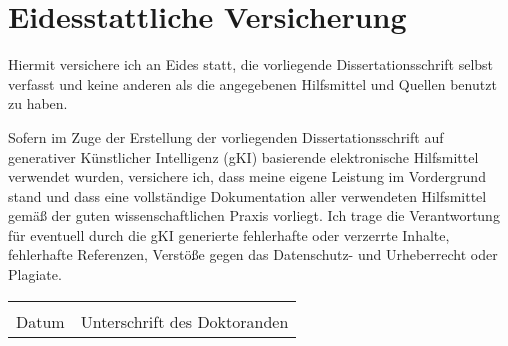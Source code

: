 \cleardoublepage
\chapter*{Eidesstattliche Versicherung}

Hiermit versichere ich an Eides statt, die vorliegende Dissertationsschrift selbst verfasst und
keine anderen als die angegebenen Hilfsmittel und Quellen benutzt zu haben.

Sofern im Zuge der Erstellung der vorliegenden Dissertationsschrift auf generativer K{\"u}nstlicher
Intelligenz (gKI) basierende elektronische Hilfsmittel verwendet wurden, versichere ich, dass meine
eigene Leistung im Vordergrund stand und dass eine vollst{\"a}ndige Dokumentation aller
verwendeten Hilfsmittel gem{\"a}{\ss} der guten wissenschaftlichen Praxis vorliegt. Ich trage die
Verantwortung für eventuell durch die gKI generierte fehlerhafte oder verzerrte Inhalte,
fehlerhafte Referenzen, Verst{\"o}{\ss}e gegen das Datenschutz- und Urheberrecht oder Plagiate.

\vspace{3cm}

\begin{tabular}{@{}p{1in}p{4in}@{}}
\hrulefill & \hrulefill \\
Datum & Unterschrift des Doktoranden \\
\end{tabular}